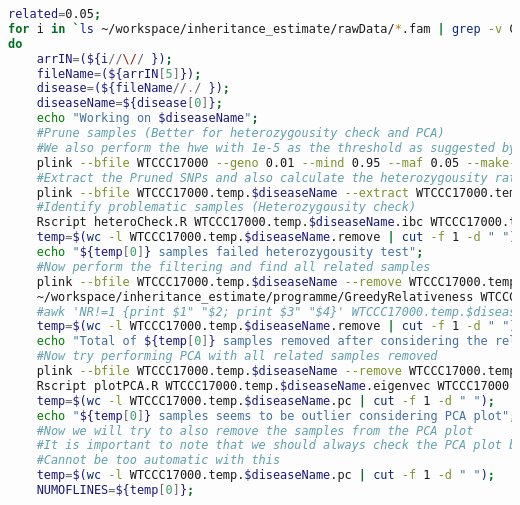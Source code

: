 \documentclass[12pt]{article}
\begin{document}
	\begin{lstlisting}[language=bash]
	related=0.05;
for i in `ls ~/workspace/inheritance_estimate/rawData/*.fam | grep -v CC`;
do
	arrIN=(${i//\// });
	fileName=(${arrIN[5]});
	disease=(${fileName//./ });
	diseaseName=${disease[0]};
	echo "Working on $diseaseName";
	#Prune samples (Better for heterozygousity check and PCA)
	#We also perform the hwe with 1e-5 as the threshold as suggested by Clara
	plink --bfile WTCCC17000 --geno 0.01 --mind 0.95 --maf 0.05 --make-bed --out WTCCC17000.temp.$diseaseName --threads 10 --indep 50 5 2 --keep $i >/dev/null 2>&1; 
	#Extract the Pruned SNPs and also calculate the heterozygousity rate
	plink --bfile WTCCC17000.temp.$diseaseName --extract WTCCC17000.temp.$diseaseName.prune.in --ibc --out WTCCC17000.temp.$diseaseName --threads 10 >/dev/null 2>&1;
	#Identify problematic samples (Heterozygousity check)
	Rscript heteroCheck.R WTCCC17000.temp.$diseaseName.ibc WTCCC17000.temp.$diseaseName.remove >/dev/null 2>&1;
	temp=$(wc -l WTCCC17000.temp.$diseaseName.remove | cut -f 1 -d " ");
	echo "${temp[0]} samples failed heterozygousity test";
	#Now perform the filtering and find all related samples
	plink --bfile WTCCC17000.temp.$diseaseName --remove WTCCC17000.temp.$diseaseName.remove --extract WTCCC17000.temp.$diseaseName.prune.in --genome --min $related --threads 10 --out WTCCC17000.temp.$diseaseName>/dev/null 2>&1;
	~/workspace/inheritance_estimate/programme/GreedyRelativeness WTCCC17000.temp.$diseaseName.genome >> WTCCC17000.temp.$diseaseName.remove;
	#awk 'NR!=1 {print $1" "$2; print $3" "$4}' WTCCC17000.temp.$diseaseName.genome | sort | uniq >> WTCCC17000.temp.$diseaseName.remove;
	temp=$(wc -l WTCCC17000.temp.$diseaseName.remove | cut -f 1 -d " ");
	echo "Total of ${temp[0]} samples removed after considering the relationship";
	#Now try performing PCA with all related samples removed
	plink --bfile WTCCC17000.temp.$diseaseName --remove WTCCC17000.temp.$diseaseName.remove --extract WTCCC17000.temp.$diseaseName.prune.in --threads 10 --pca --out WTCCC17000.temp.$diseaseName >/dev/null 2>&1;
	Rscript plotPCA.R WTCCC17000.temp.$diseaseName.eigenvec WTCCC17000.temp.$diseaseName >/dev/null 2>&1;
	temp=$(wc -l WTCCC17000.temp.$diseaseName.pc | cut -f 1 -d " ");
	echo "${temp[0]} samples seems to be outlier considering PCA plot";
	#Now we will try to also remove the samples from the PCA plot
	#It is important to note that we should always check the PCA plot beforehand
	#Cannot be too automatic with this
	temp=$(wc -l WTCCC17000.temp.$diseaseName.pc | cut -f 1 -d " ");
	NUMOFLINES=${temp[0]};

\end{lstlisting}
\end{document}
